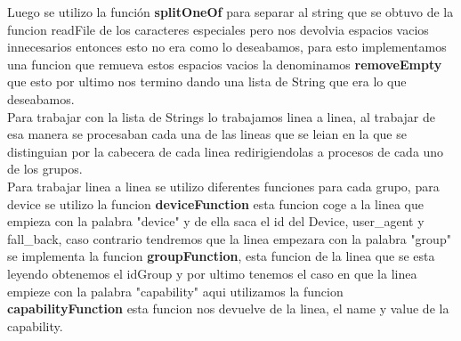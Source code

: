 \documentclass[a4paper,openright,12pt]{report}
\begin{document}
Luego se utilizo la función \textbf{splitOneOf} para separar al string que se obtuvo de la funcion readFile de los caracteres especiales pero nos devolvia espacios vacios innecesarios entonces esto no era como lo deseabamos, para esto implementamos una funcion que remueva estos espacios vacios la denominamos \textbf{removeEmpty} que esto por ultimo nos termino dando una lista de String que era lo que deseabamos.\\

Para trabajar con la lista de Strings lo trabajamos linea a linea, al trabajar de esa manera se procesaban cada una de las lineas que se leian en la que se distinguian por la cabecera de cada linea redirigiendolas a procesos de cada uno de los grupos.\\

Para trabajar linea a linea se utilizo diferentes funciones para cada grupo, para device se utilizo la funcion \textbf{deviceFunction} esta funcion coge a la linea que empieza con la palabra "device" y de ella saca el id del Device, user\_agent y fall\_back, caso contrario tendremos que la linea empezara con la palabra "group" se implementa la funcion \textbf{groupFunction}, esta funcion de la linea que se esta leyendo obtenemos el idGroup y por ultimo tenemos el caso en que la linea empieze con la palabra "capability" aqui utilizamos la funcion \textbf{capabilityFunction} esta funcion nos devuelve de la linea, el name y value de la capability.\\
\end{document}
